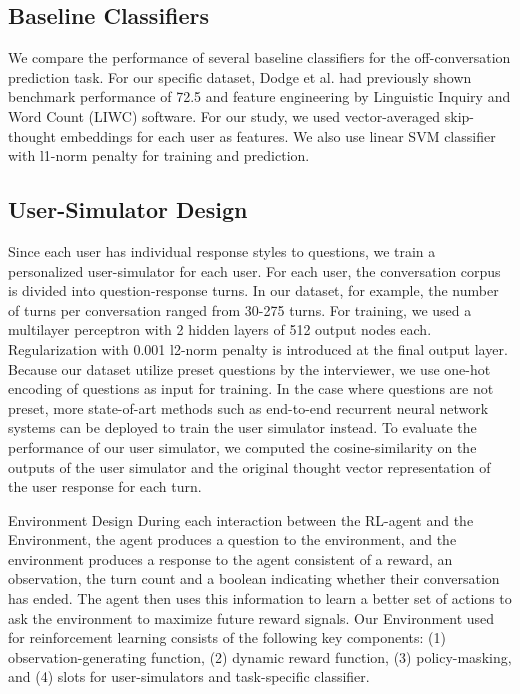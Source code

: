 \subsection{ Baseline Classifiers }
We compare the performance of several baseline classifiers for the off-conversation prediction task. 
For our specific dataset, Dodge et al. had previously shown benchmark performance of 
72.5%
and feature engineering by Linguistic Inquiry and Word Count (LIWC) software. 
For our study, we used vector-averaged skip-thought embeddings for each user as features. 
We also use linear SVM classifier with l1-norm penalty for training and prediction.


\subsection{ User-Simulator Design }
Since each user has individual response styles to questions, 
we train a personalized user-simulator for each user. For each user, 
the conversation corpus is divided into question-response turns. 
In our dataset, for example, the number of turns per conversation ranged from 30-275 turns. 
For training, we used a multilayer perceptron with 2 hidden layers of 512 output nodes each. 
Regularization with 0.001 l2-norm penalty is introduced at the final output layer. 
Because our dataset utilize preset questions by the interviewer, we use one-hot encoding of questions as input for training. 
In the case where questions are not preset, 
more state-of-art methods such as end-to-end recurrent neural network systems can be deployed to train the user simulator 
instead. To evaluate the performance of our user simulator, 
we computed the cosine-similarity on the outputs of the user simulator and the original thought vector representation 
of the user response for each turn.

{ Environment Design }
During each interaction between the RL-agent and the Environment, 
the agent produces a question to the environment, and 
the environment produces a response to the agent consistent of a reward, an observation, 
the turn count and a boolean indicating whether their conversation has ended. 
The agent then uses this information to learn a better set of actions to ask the environment 
to maximize future reward signals. 
Our Environment used for reinforcement learning consists of the following key components: 
(1) observation-generating function, 
(2) dynamic reward function, (3) policy-masking, and (4) slots for user-simulators and task-specific classifier. 


